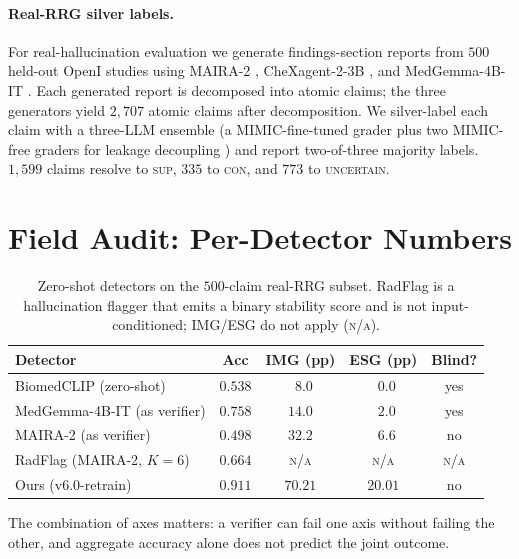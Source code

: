 \documentclass{article}
\begin{document}
\paragraph{Real-RRG silver labels.} For real-hallucination evaluation we
generate findings-section reports from $500$ held-out OpenI studies
using MAIRA-2 \citep{bannur2024maira2}, CheXagent-2-3B
\citep{chen2024chexagent}, and MedGemma-4B-IT \citep{google2024medgemma}.
Each generated report is decomposed into atomic claims; the three
generators yield $2{,}707$ atomic claims after decomposition. We
silver-label each claim with a three-LLM ensemble (a MIMIC-fine-tuned
grader plus two MIMIC-free graders for leakage decoupling
\citep{ostmeier2024green}) and report two-of-three majority labels.
$1{,}599$ claims resolve to \textsc{sup}, $335$ to \textsc{con}, and
$773$ to \textsc{uncertain}.

\section{Field Audit: Per-Detector Numbers}
\label{app:fieldaudit}

\begin{table}[t]
\centering
\small
\caption{Zero-shot detectors on the $500$-claim real-RRG subset. RadFlag
is a hallucination flagger that emits a binary stability score and is
not input-conditioned; IMG/ESG do not apply (\textsc{n/a}).}
\label{tab:baselines}
\begin{tabular}{lcccc}
\toprule
\textbf{Detector} & \textbf{Acc} & \textbf{IMG (pp)} & \textbf{ESG (pp)} & \textbf{Blind?} \\
\midrule
BiomedCLIP (zero-shot)              & $0.538$ & $\phantom{0}8.0$  & $\phantom{0}0.0$  & yes \\
MedGemma-4B-IT (as verifier)        & $0.758$ & $14.0$ & $\phantom{0}2.0$  & yes \\
MAIRA-2 (as verifier)               & $0.498$ & $32.2$ & $\phantom{0}6.6$  & no  \\
RadFlag (MAIRA-2, $K{=}6$)          & $0.664$ & \textsc{n/a}  & \textsc{n/a}  & \textsc{n/a} \\
Ours (v6.0-retrain)                 & $0.911$ & $70.21$ & $20.01$ & no  \\
\bottomrule
\end{tabular}
\end{table}

The combination of axes matters: a verifier can fail one axis without
failing the other, and aggregate accuracy alone does not predict the
joint outcome.
\end{document}
